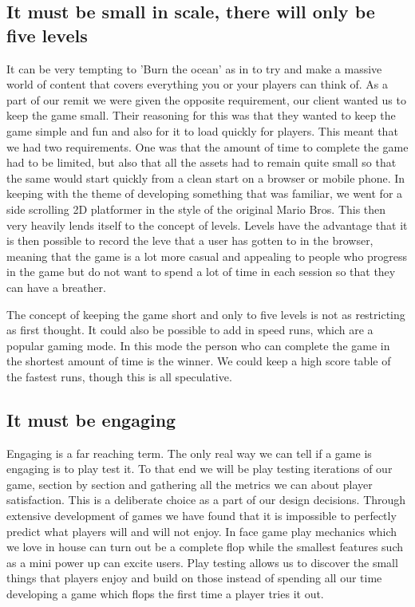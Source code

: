 \documentclass{article}
\begin{document}
\subsection{ It must be small in scale, there will only be five levels }
It can be very tempting to 'Burn the ocean' as in to try and make a massive world of content that covers everything you or your players can think of. As a part of our remit we were given the opposite requirement, our client wanted us to keep the game small. Their reasoning for this was that they wanted to keep the game simple and fun and also for it to load quickly for players.
This meant that we had two requirements. One was that the amount of time to complete the game had to be limited, but also that all the assets had to remain quite small so that the same would start quickly from a clean start on a browser or mobile phone. In keeping with the theme of developing something that was familiar, we went for a side scrolling 2D platformer in the style of the original Mario Bros. This then very heavily lends itself to the concept of levels. Levels have the advantage that it is then possible to record the leve that a user has gotten to in the browser, meaning that the game is a lot more casual and appealing to people who progress in the game but do not want to spend a lot of time in each session so that they can have a breather.

The concept of keeping the game short and only to five levels is not as restricting as first thought. It could also be possible to add in speed runs, which are a popular gaming mode. In this mode the person who can complete the game in the shortest amount of time is the winner. We could keep a high score table of the fastest runs, though this is all speculative.

\subsection{ It must be engaging }
Engaging is a far reaching term. The only real way we can tell if a game is engaging is to play test it. To that end we will be play testing iterations of our game, section by section and gathering all the metrics we can about player satisfaction. This is a deliberate choice as a part of our design decisions. Through extensive development of games we have found that it is impossible to perfectly predict what players will and will not enjoy. In face game play mechanics which we love in house can turn out be a complete flop while the smallest features such as a mini power up can excite users. Play testing allows us to discover the small things that players enjoy and build on those instead of spending all our time developing a game which flops the first time a player tries it out.
\end{document}
